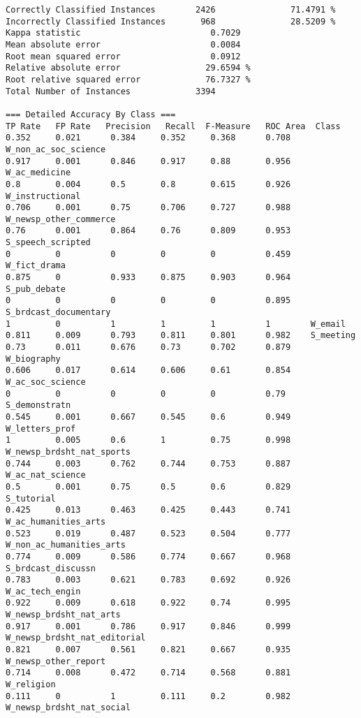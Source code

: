 \begin{verbatim}
Correctly Classified Instances        2426               71.4791 %
Incorrectly Classified Instances       968               28.5209 %
Kappa statistic                          0.7029
Mean absolute error                      0.0084
Root mean squared error                  0.0912
Relative absolute error                 29.6594 %
Root relative squared error             76.7327 %
Total Number of Instances             3394     

=== Detailed Accuracy By Class ===
TP Rate   FP Rate   Precision   Recall  F-Measure   ROC Area  Class
0.352     0.021      0.384     0.352     0.368      0.708    W_non_ac_soc_science
0.917     0.001      0.846     0.917     0.88       0.956    W_ac_medicine
0.8       0.004      0.5       0.8       0.615      0.926    W_instructional
0.706     0.001      0.75      0.706     0.727      0.988    W_newsp_other_commerce
0.76      0.001      0.864     0.76      0.809      0.953    S_speech_scripted
0         0          0         0         0          0.459    W_fict_drama
0.875     0          0.933     0.875     0.903      0.964    S_pub_debate
0         0          0         0         0          0.895    S_brdcast_documentary
1         0          1         1         1          1        W_email
0.811     0.009      0.793     0.811     0.801      0.982    S_meeting
0.73      0.011      0.676     0.73      0.702      0.879    W_biography
0.606     0.017      0.614     0.606     0.61       0.854    W_ac_soc_science
0         0          0         0         0          0.79     S_demonstratn
0.545     0.001      0.667     0.545     0.6        0.949    W_letters_prof
1         0.005      0.6       1         0.75       0.998    W_newsp_brdsht_nat_sports
0.744     0.003      0.762     0.744     0.753      0.887    W_ac_nat_science
0.5       0.001      0.75      0.5       0.6        0.829    S_tutorial
0.425     0.013      0.463     0.425     0.443      0.741    W_ac_humanities_arts
0.523     0.019      0.487     0.523     0.504      0.777    W_non_ac_humanities_arts
0.774     0.009      0.586     0.774     0.667      0.968    S_brdcast_discussn
0.783     0.003      0.621     0.783     0.692      0.926    W_ac_tech_engin
0.922     0.009      0.618     0.922     0.74       0.995    W_newsp_brdsht_nat_arts
0.917     0.001      0.786     0.917     0.846      0.999    W_newsp_brdsht_nat_editorial
0.821     0.007      0.561     0.821     0.667      0.935    W_newsp_other_report
0.714     0.008      0.472     0.714     0.568      0.881    W_religion
0.111     0          1         0.111     0.2        0.982    W_newsp_brdsht_nat_social

\end{verbatim}
